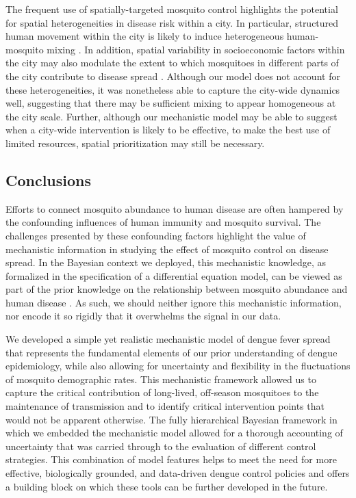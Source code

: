 \documentclass[10pt,letterpaper]{article}
\begin{document}
The frequent use of spatially-targeted mosquito control highlights the potential for spatial heterogeneities in disease risk within a city.
In particular, structured human movement within the city is likely to induce heterogeneous human-mosquito mixing \cite{Adams2009, Cosner2009a, Stoddard2009}.
In addition, spatial variability in socioeconomic factors within the city may also modulate the extent to which mosquitoes in different parts of the city contribute to disease spread \cite{Mondini2008, Honorio2009, Hu2012, DeMattosAlmeida2007}.
Although our model does not account for these heterogeneities, it was nonetheless able to capture the city-wide dynamics well, suggesting that there may be sufficient mixing to appear homogeneous at the city scale.
Further, although our mechanistic model may be able to suggest when a city-wide intervention is likely to be effective, to make the best use of limited resources, spatial prioritization may still be necessary.

\subsection*{Conclusions}

Efforts to connect mosquito abundance to human disease are often hampered by the confounding influences of human immunity and mosquito survival.
The challenges presented by these confounding factors highlight the value of mechanistic information in studying the effect of mosquito control on disease spread.
In the Bayesian context we deployed, this mechanistic knowledge, as formalized in the specification of a differential equation model, can be viewed as part of the prior knowledge on the relationship between mosquito abundance and human disease \cite{Ellner1998, Wikle2010}.
As such, we should neither ignore this mechanistic information, nor encode it so rigidly that it overwhelms the signal in our data.

We developed a simple yet realistic mechanistic model of dengue fever spread that represents the fundamental elements of our prior understanding of dengue epidemiology, while also allowing for uncertainty and flexibility in the fluctuations of mosquito demographic rates.
This mechanistic framework allowed us to capture the critical contribution of long-lived, off-season mosquitoes to the maintenance of transmission and to identify critical intervention points that would not be apparent otherwise.
The fully hierarchical Bayesian framework in which we embedded the mechanistic model allowed for a thorough accounting of uncertainty that was carried through to the evaluation of different control strategies.
This combination of model features helps to meet the need for more effective, biologically grounded, and data-driven dengue control policies and offers a building block on which these tools can be further developed in the future.
\end{document}
